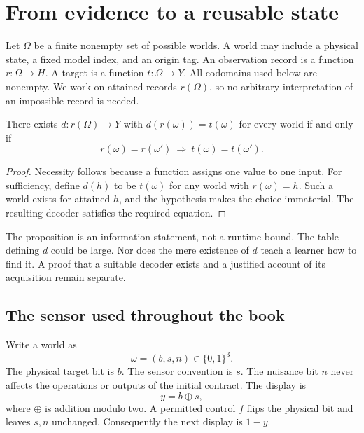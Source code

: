 \chapter{From evidence to a reusable state}\label{ch:evidence}
Let $\Omega$ be a finite nonempty set of possible worlds. A world may include a physical state, a fixed model index, and an origin tag. An observation record is a function $r:\Omega\to H$. A target is a function $t:\Omega\to Y$. All codomains used below are nonempty. We work on attained records $r(\Omega)$, so no arbitrary interpretation of an impossible record is needed.

\begin{proposition}\label{r:factor}
There exists $d:r(\Omega)\to Y$ with $d(r(\omega))=t(\omega)$ for every world if and only if
\[
r(\omega)=r(\omega')\ \Longrightarrow\ t(\omega)=t(\omega').
\]
\end{proposition}
\begin{proof}
Necessity follows because a function assigns one value to one input. For sufficiency, define $d(h)$ to be $t(\omega)$ for any world with $r(\omega)=h$. Such a world exists for attained $h$, and the hypothesis makes the choice immaterial. The resulting decoder satisfies the required equation.
\end{proof}

The proposition is an information statement, not a runtime bound. The table defining $d$ could be large. Nor does the mere existence of $d$ teach a learner how to find it. A proof that a suitable decoder exists and a justified account of its acquisition remain separate.

\section{The sensor used throughout the book}
Write a world as
\[
\omega=(b,s,n)\in\{0,1\}^3.
\]
The physical target bit is $b$. The sensor convention is $s$. The nuisance bit $n$ never affects the operations or outputs of the initial contract. The display is
\[
y=b\oplus s,
\]
where $\oplus$ is addition modulo two. A permitted control $f$ flips the physical bit and leaves $s,n$ unchanged. Consequently the next display is $1-y$.

